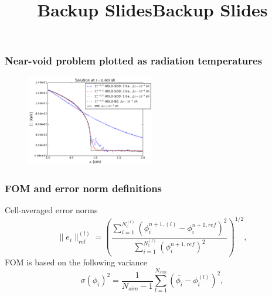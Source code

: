 \documentclass[xcolor=dvipsnames,hyperref={pdfpagelabels=false},unknownkeysallowed]{beamer}
\newcommand{\ds}[0]{\displaystyle}
\begin{document}
\begin{frame}
    \titlepage \vspace{-0.213in}
    \begin{center}
    \end{center}    
\end{frame}
\appendix
{}
\setcounter{finalframe}{\value{framenumber}}
\date{}
\title{Backup Slides}
\begin{frame}
    \vspace{-0.21in}
    \titlepage \vspace{-0.2113in}
\end{frame}

\title{Backup Slides}
\author{}
\date{}


\begin{frame}
\frametitle{Near-void problem plotted as radiation temperatures}
\begin{figure}
  \centering
    \includegraphics[width=0.5\textwidth]{void_temp_batch_compare.pdf}
\end{figure}
\end{frame}

\begin{frame}
    \frametitle{FOM and error norm definitions}
    Cell-averaged error norms
\begin{equation}
    \|e_i\|^{{(l)}}_{rel} = \left({\frac{\ds \sum\limits_{i=1}^{N^{(l)}_c}
    \left(\phi_i^{n+1,{(l)}} - \phi_i^{n+1,ref}
\right)^2}{\ds \sum\limits_{i=1}^{N^{(l)}_c}\left(\phi_i^{n+1,ref}\right)^2}}\right)^{1/2},
\end{equation}
FOM is based on the following variance
\begin{equation} 
    \sigma(\phi_i)^2 =  \frac{1}{N_{sim}-1} \sum_{l=1}^{N_{sim}} \left(\overline{\phi_{i}} -
    \phi_{i}^{(l)}\right)^2,
\end{equation}
\end{frame}
\end{document}

